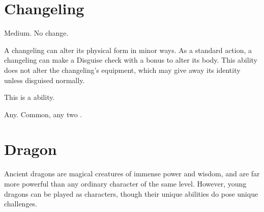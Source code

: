 \section{Changeling}

     Medium.
     No change.
    \begin{itemize}
         A changeling can alter its physical form in minor ways. As a standard action, a changeling can make a Disguise check with a  bonus to alter its body. This ability does not alter the changeling's equipment, which may give away its identity unless disguised normally.

        This is a \magical ability.
    \end{itemize}
     Any.
     Common, any two .

\section{Dragon}
    Ancient dragons are magical creatures of immense power and wisdom, and are far more powerful than any ordinary character of the same level.
    However, young dragons can be played as characters, though their unique abilities do pose unique challenges.


